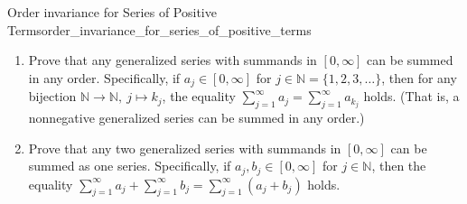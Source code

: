 \begin{mystexercise}{Order invariance for Series of Positive Terms}{order_invariance_for_series_of_positive_terms}\label{order_invariance_for_series_of_positive_terms}\begin{enumerate}
\item Prove that any generalized series with summands in $[0, \infty]$ can be summed in any order. Specifically, if $a_j \in [0, \infty]$ for $j \in \mathbb{N} = \{1, 2, 3, \dots\}$, then for any bijection $\mathbb{N} \to \mathbb{N},\ j \mapsto k_j$, the equality $\sum_{j=1}^\infty a_j = \sum_{j=1}^\infty a_{k_j}$ holds. (That is, a nonnegative generalized series can be summed in any order.)
\item Prove that any two generalized series with summands in $[0, \infty]$ can be summed as one series. Specifically, if $a_j, b_j \in [0, \infty]$ for $j \in \mathbb{N}$, then the equality $\sum_{j=1}^\infty a_j + \sum_{j=1}^\infty b_j = \sum_{j=1}^\infty (a_j + b_j)$ holds.
\end{enumerate}

\end{mystexercise}
